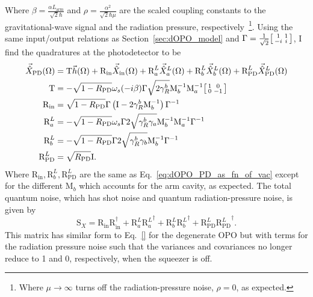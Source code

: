 Where $\beta = \frac{\alpha L_\mathrm{arm}}{\sqrt{2}\hbar}$ and $\rho = \frac{\alpha^2}{\sqrt{2}\hbar\mu}$ are the scaled coupling constants to the gravitational-wave signal and the radiation pressure, respectively~\footnote{Where $\mu\rightarrow\infty$ turns off the radiation-pressure noise, $\rho=0$, as expected.}.
Using the same input/output relations as Section~\ref{sec:dOPO_model} and $\Gamma=\frac{1}{\sqrt2}\begin{bsmallmatrix}1 & 1 \\-i & i\end{bsmallmatrix}$, I find the quadratures at the photodetector to be
\begin{align}
\vec{\hat X}_\mathrm{PD}(\Omega)&=\text{T}\vec h(\Omega)+\text{R}_\text{in}\vec{\hat X}_\mathrm{in}(\Omega)+\text{R}^L_a\vec{\hat X}^L_a(\Omega)+\text{R}^L_b\vec{\hat X}^L_b(\Omega)+\text{R}^L_\text{PD}\vec{\hat X}^L_\text{PD}(\Omega)\\
\text{T}&=-\sqrt{1-R_\text{PD}}\omega_s(-i\beta)\Gamma \sqrt{2\gamma^b_R}\text{M}_b^{-1}\text{M}_a^{-1}\begin{bsmallmatrix}1 & 0 \\0 & -1\end{bsmallmatrix}\\
\text{R}_\text{in}&=\sqrt{1-R_\text{PD}}\Gamma\left(\text{I}-2\gamma^b_R\text{M}_b^{-1}\right)\Gamma^{-1}\\
\text{R}^L_a&=-\sqrt{1-R_\text{PD}}\omega_s\Gamma 2\sqrt{\gamma^b_R \gamma_a}\text{M}_b^{-1}\text{M}_a^{-1}\Gamma^{-1}\\
\text{R}^L_b&=-\sqrt{1-R_\text{PD}}\Gamma 2\sqrt{\gamma^b_R \gamma_b}\text{M}_b^{-1}\Gamma^{-1}\\
\text{R}^L_\text{PD}&=\sqrt{R_\text{PD}} \text{I}.
\end{align}
Where $\text{R}_\text{in},\text{R}^L_b,\text{R}^L_\text{PD}$ are the same as Eq.~\ref{eq:dOPO_PD_as_fn_of_vac} except for the different $\text{M}_b$ which accounts for the arm cavity, as expected.
The total quantum noise, which has shot noise and quantum radiation-pressure noise, is given by \begin{equation}
\text{S}_X=\text{R}_\text{in}\text{R}_\text{in}^\dag+\text{R}^L_a{\text{R}^L_a}^\dag+\text{R}^L_b{\text{R}^L_b}^\dag+\text{R}^L_\text{PD}{\text{R}^L_\text{PD}}^\dag.
\end{equation}
This matrix has similar form to Eq.~\ref{} for the degenerate OPO but with terms for the radiation pressure noise such that the variances and covariances no longer reduce to 1 and 0, respectively, when the squeezer is off. 

